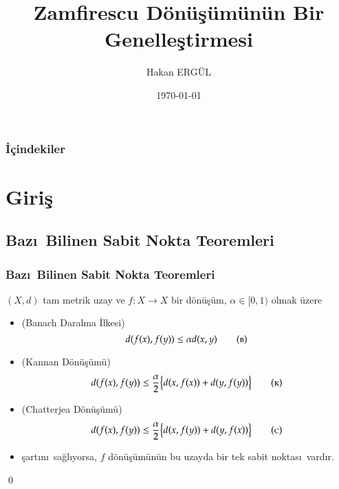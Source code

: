 \documentclass[8pt]{beamer}
\title{Zamfirescu D\"on\"u\c{s}\"um\"un\"un Bir Genelle\c{s}tirmesi}
\author{Hakan ERG\"UL}
\institute{Atat\"{u}rk \"{U}niversitesi}
\date{\today}
\begin{document}
\begin{frame}
\titlepage
\end{frame}
\begin{frame}
  \frametitle{\.{I}\c{c}indekiler}
  \tableofcontents
\end{frame}


\section{Giri\c{s}}
\subsection{Baz\i \ Bilinen Sabit Nokta Teoremleri}

\begin{frame}
\frametitle{Baz\i \ Bilinen Sabit Nokta Teoremleri}
   $(X,d)$  tam metrik uzay ve $f: X \rightarrow X$ bir d\"{o}n\"{u}\c{s}\"{u}m, $\alpha \in [0,1)$ olmak \"{u}zere 
   \begin{itemize}[<+-| alert@+>]

   \item (Banach Daralma \.{I}lkesi\cite{Banach1922})
     \begin{equation} 
       d(f(x), f(y))\leq \alpha d(x,y)
\tag*{\textsc{(b)}}
        \end{equation}
   \item (Kannan D\"{o}n\"{u}\c{s}\"{u}m\"{u}\cite{Kannan1969})
     \begin{equation} 
       d(f(x), f(y))\leq \frac{\alpha}{2}\big\{ d(x,f(x))+d(y,f(y))\big\}
\tag*{\textsc{(k)}}
         \end{equation}
   \item (Chatterjea D\"{o}n\"{u}\c{s}\"{u}m\"{u}\cite{Chatterjea1972})
     \begin{equation} 
       d(f(x), f(y))\leq \frac{\alpha}{2}\big\{ d(x,f(y))+d(y,f(x))\big\}
\tag*{\textsc{(c)}}
         \end{equation}
\item[] \c{s}art\i n\i\ sa\u{g}l\i yorsa, $f$ d\"{o}n\"{u}\c{s}\"{u}m\"{u}n\"{u}n bu uzayda bir tek sabit noktas\i\ vard\i r.

   \end{itemize}

    \qed
\end{frame}%
\end{document}
